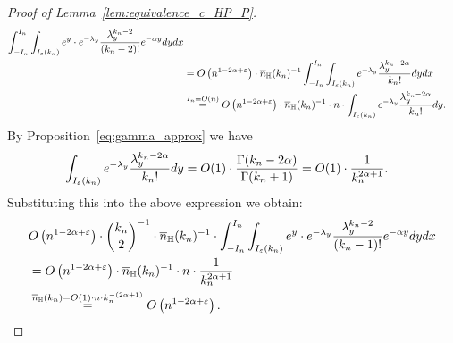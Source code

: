 \begin{proof}[Proof of Lemma~\ref{lem:equivalence_c_HP_P}]
\begin{equation*}
\begin{split}
\int_{-I_n}^{I_n} \int_{I_\varepsilon (k_n)} 
e^{y} \cdot e^{-\lambda_y} 
\frac{\lambda_y^{k_n-2}}{(k_n-2)!} e^{-\alpha y} dy dx \\ 
&= O\left( n^{1-2\alpha + \varepsilon} \right) \cdot \overline{n}_{\mathbb{H}}(k_n)^{-1}
\int_{-I_n}^{I_n} \int_{I_\varepsilon (k_n)} 
e^{-\lambda_y} 
\frac{\lambda_y^{k_n - 2\alpha}}{k_n!}  dy dx \\ 
&\stackrel{I_n = O(n)}{=}  O\left( n^{1-2\alpha + \varepsilon} \right) \cdot \overline{n}_{\mathbb{H}}(k_n)^{-1} \cdot  n \cdot 
\int_{I_\varepsilon (k_n)} e^{-\lambda_y} 
\frac{\lambda_y^{k_n -2\alpha}}{k_n!} dy. 
\end{split}
\end{equation*}
By Proposition~\ref{eq:gamma_approx} we have
\begin{equation*} 
\begin{split} 
&\int_{I_\varepsilon (k_n)} e^{-\lambda_y} \frac{\lambda_y^{k_n-2\alpha}}{k_n!}  dy= 
O(1) \cdot \frac{\Gamma(k_n-2\alpha)}{\Gamma (k_n+1)} = O(1) \cdot 
\frac{1}{k_n^{2\alpha +1}}.
\end{split}
\end{equation*}
Substituting this into the above expression we obtain: 
\begin{equation*}
\begin{split}
&O\left( n^{1-2\alpha + \varepsilon} \right) \cdot {k_n \choose 2}^{-1} \cdot \overline{n}_{\mathbb{H}}(k_n)^{-1} \cdot
\int_{-I_n}^{I_n} \int_{I_\varepsilon (k_n)} e^{y }\cdot
e^{-\lambda_y} 
\frac{\lambda_y^{k_n-2}}{(k_n-1)!} e^{-\alpha y} dy dx \\ 
&=O\left( n^{1-2\alpha + \varepsilon} \right) \cdot  \overline{n}_{\mathbb{H}}(k_n)^{-1} \cdot n \cdot  
\frac{1}{k_n^{2\alpha +1}} \\
&\stackrel{\overline{n}_{\mathbb{H}}(k_n) = O(1) \cdot n \cdot k_n^{-(2\alpha +1)}}{=}O\left( n^{1-2\alpha + \varepsilon} \right).
\end{split}
\end{equation*}

\end{proof}
